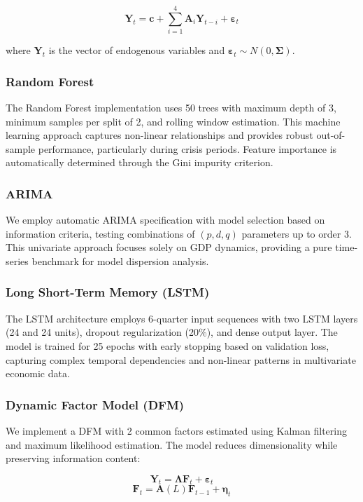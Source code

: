 \documentclass[12pt,a4paper]{article}
\theoremstyle{remark}
\begin{document}
$$\mathbf{Y}_t = \mathbf{c} + \sum_{i=1}^{4} \mathbf{A}_i \mathbf{Y}_{t-i} + \boldsymbol{\varepsilon}_t$$

where $\mathbf{Y}_t$ is the vector of endogenous variables and $\boldsymbol{\varepsilon}_t \sim N(0, \boldsymbol{\Sigma})$.

\subsubsection{Random Forest}
The Random Forest implementation uses 50 trees with maximum depth of 3, minimum samples per split of 2, and rolling window estimation. This machine learning approach captures non-linear relationships and provides robust out-of-sample performance, particularly during crisis periods. Feature importance is automatically determined through the Gini impurity criterion.

\subsubsection{ARIMA}
We employ automatic ARIMA specification with model selection based on information criteria, testing combinations of $(p,d,q)$ parameters up to order 3. This univariate approach focuses solely on GDP dynamics, providing a pure time-series benchmark for model dispersion analysis.

\subsubsection{Long Short-Term Memory (LSTM)}
The LSTM architecture employs 6-quarter input sequences with two LSTM layers (24 and 24 units), dropout regularization (20\%), and dense output layer. The model is trained for 25 epochs with early stopping based on validation loss, capturing complex temporal dependencies and non-linear patterns in multivariate economic data.

\subsubsection{Dynamic Factor Model (DFM)}
We implement a DFM with 2 common factors estimated using Kalman filtering and maximum likelihood estimation. The model reduces dimensionality while preserving information content:

$$\mathbf{Y}_t = \boldsymbol{\Lambda} \mathbf{F}_t + \boldsymbol{\varepsilon}_t$$
$$\mathbf{F}_t = \mathbf{A}(L) \mathbf{F}_{t-1} + \boldsymbol{\eta}_t$$
\end{document}
